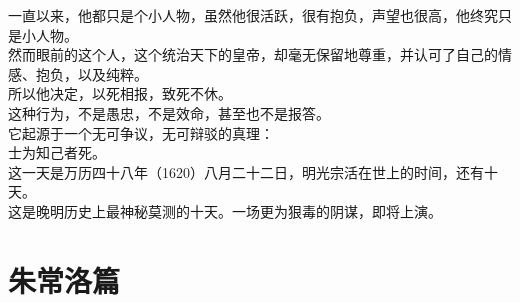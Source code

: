 \begin{multicols}{\theparacolNo}
一直以来，他都只是个小人物，虽然他很活跃，很有抱负，声望也很高，他终究只是小人物。\\

然而眼前的这个人，这个统治天下的皇帝，却毫无保留地尊重，并认可了自己的情感、抱负，以及纯粹。\\

所以他决定，以死相报，致死不休。\\

这种行为，不是愚忠，不是效命，甚至也不是报答。\\

它起源于一个无可争议，无可辩驳的真理：\\

士为知己者死。\\

这一天是万历四十八年（1620）八月二十二日，明光宗活在世上的时间，还有十天。\\

这是晚明历史上最神秘莫测的十天。一场更为狠毒的阴谋，即将上演。\\
\ifnum{}
	\end{multicols}
\fi
\newpage

\chapter*{朱常洛篇}
